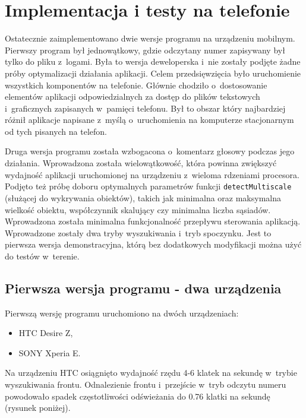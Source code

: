 \chapter{Implementacja i testy na telefonie}

Ostatecznie zaimplementowano dwie wersje programu na urządzeniu mobilnym.
Pierwszy program był jednowątkowy, gdzie odczytany numer zapisywany
był tylko do pliku z~logami. Była
to wersja deweloperska i~nie zostały podjęte żadne próby optymalizacji
działania aplikacji. Celem przedsięwzięcia
było uruchomienie wszystkich komponentów na telefonie. Głównie
chodziło o~dostosowanie elementów aplikacji odpowiedzialnych za
dostęp do plików tekstowych i~graficznych zapisanych w~pamięci telefonu.
Był to obszar który najbardziej różnił aplikacje napisane z~myślą
o~uruchomienia na komputerze stacjonarnym od tych pisanych na telefon.

Druga wersja programu została wzbogacona o~komentarz głosowy
podczas jego działania. Wprowadzona została wielowątkowość, 
która powinna zwiększyć wydajność aplikacji uruchomionej na 
urządzeniu z~wieloma rdzeniami procesora. Podjęto też próbę
doboru optymalnych parametrów funkcji \verb|detectMultiscale| 
(służącej do wykrywania obiektów), takich jak minimalna oraz
maksymalna wielkość obiektu, współczynnik skalujący czy minimalna
liczba sąsiadów. Wprowadzona została minimalna funkcjonalność przepływu
sterowania aplikacją. Wprowadzone zostały dwa tryby wyszukiwania
i~tryb spoczynku. Jest to pierwsza wersja demonstracyjna, którą
bez dodatkowych modyfikacji można użyć do testów w~terenie.

\section{Pierwsza wersja programu - dwa urządzenia}

Pierwszą wersję programu uruchomiono na dwóch urządzeniach:

\begin{itemize}
    \item HTC Desire Z,
    \item SONY Xperia E.
\end{itemize}

Na urządzeniu HTC osiągnięto wydajność rzędu 4-6 klatek na sekundę
w~trybie wyszukiwania frontu. Odnalezienie frontu i~przejście 
w~tryb odczytu numeru powodowało spadek częstotliwości odświeżania
do 0.76 klatki na sekundę (rysunek poniżej).

